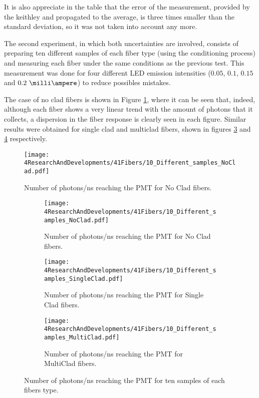 It is also appreciate in the table that the error of the measurement, provided by the keithley and propagated to the average, is three times smaller than the standard deviation, so it was not taken into account any more.


The second experiment, in which both uncertainties are involved, consists of preparing ten different samples of each fiber type (using the conditioning process) and measuring each fiber under the same conditions as the previous test. This measurement was done for four different LED emission intensities ($0.05$, $0.1$, $0.15$ and $0.2~\milli\ampere$) to reduce possibles mistakes.

The case of no clad fibers is shown in Figure \ref{fig:10samplesNC}, where it can be seen that, indeed, although each fiber shows a very linear trend with the amount of photons that it collects, a dispersion in the fiber response is clearly seen in each figure. Similar results were obtained for single clad and multiclad fibers, shown in figures \ref{subfig:10samplesSC} and \ref{subfig:10samplesMC} respectively.

\begin{figure}[h]
\centering
\texttt{[image: 4ResearchAndDevelopments/41Fibers/10\_Different\_samples\_NoClad.pdf]}
\caption{Number of photons/ns reaching the PMT for No Clad fibers.\label{fig:10samplesNC}}
\end{figure}

\begin{figure}
\centering
    \begin{subfigure}[b]{0.6\textwidth}
    \centering
    \texttt{[image: 4ResearchAndDevelopments/41Fibers/10\_Different\_samples\_NoClad.pdf]}  
    \caption{Number of photons/ns reaching the PMT for No Clad fibers.\label{subfig:10samplesNC}}
    \end{subfigure}
    \hfill
    \begin{subfigure}[b]{0.6\textwidth}
    \centering
    \texttt{[image: 4ResearchAndDevelopments/41Fibers/10\_Different\_samples\_SingleClad.pdf]}  
    \caption{Number of photons/ns reaching the PMT for Single Clad fibers.\label{subfig:10samplesSC}}
    \end{subfigure}
    \hfill
    \begin{subfigure}[b]{0.6\textwidth}
    \centering
    \texttt{[image: 4ResearchAndDevelopments/41Fibers/10\_Different\_samples\_MultiClad.pdf]}  
    \caption{Number of photons/ns reaching the PMT for MultiClad fibers.\label{subfig:10samplesMC}}
    \end{subfigure}
 \caption{Number of photons/ns reaching the PMT for ten samples of each fibers type.}
 \label{fig:10samplesThreeTypes}
\end{figure}

